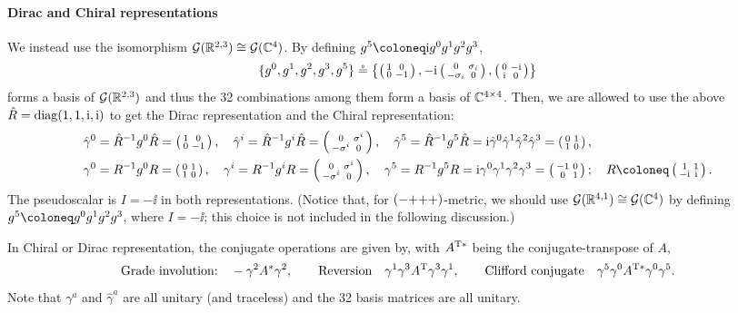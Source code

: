 \documentclass[CheatSheet]{subfiles}
\begin{document}
\paragraph{Dirac and Chiral representations}
We instead use the isomorphism $\operatorname{\mathcal{G}}({\mathbb{R}}^{2,3})\cong\operatorname{\mathcal{G}}({\mathbb{C}}^4)$. By defining $g^5\deq\ii g^0g^1g^2g^3$,
\[
\{g^0,g^1,g^2,g^3,g^5\}\circeq \left\{\left(\begin{smallmatrix}1&0\\0&-1\end{smallmatrix}\right),-{\mathrm{i}}\left(\begin{smallmatrix}0&\sigma_i\\-\sigma_i&0\end{smallmatrix}\right),\left(\begin{smallmatrix}0&-{\mathrm{i}}\\{\mathrm{i}}&0\end{smallmatrix}\right)\right\}
\]
forms a basis of $\operatorname{\mathcal{G}}({\mathbb{R}}^{2,3})$ and thus the 32 combinations among them form a basis of ${\mathbb{C}}^{4\times4}$.
Then, we are allowed to use the above $\hat R=\operatorname{\mathrm{diag}}(1,1,{\mathrm{i}},{\mathrm{i}})$ to get the Dirac representation and the Chiral representation:
\begin{align}
&\hat\gamma^0=\hat R^{-1}g^0 \hat R=\spmat{1&0\\0&-1},\quad
\hat\gamma^i=\hat R^{-1}g^i \hat R=\spmat{0&\sigma^i\\-\sigma^i&0},\quad
\hat\gamma^5=\hat R^{-1}g^5 \hat R=\ii\hat\gamma^0\hat\gamma^1\hat\gamma^2\hat\gamma^3=\spmat{0&1\\1&0},\\
&\gamma^0=R^{-1}g^0 R=\spmat{0&1\\1&0},\quad
\gamma^i=R^{-1}g^i R=\spmat{0&\sigma^i\\-\sigma^i&0},\quad
\gamma^5=R^{-1}g^5 R=\ii\gamma^0\gamma^1\gamma^2\gamma^3=\spmat{-1&0\\0&1};\quad
R\deq\spmat{1&1\\-\ii&\ii}.
\end{align}
The pseudoscalar is $I=-\ii$ in both representations.
(Notice that, for $(\mathord{-}\mathord{+}\mathord{+}\mathord{+})$-metric, we should use $\operatorname{\mathcal{G}}({\mathbb{R}}^{4,1})\cong\operatorname{\mathcal{G}}({\mathbb{C}}^4)$ by defining $g^5\deq g^0g^1g^2g^3$, where $I=-\ii$; this choice is not included in the following discussion.)

In Chiral or Dirac representation, the conjugate operations are given by, with $A^{{\mathrm{T}}*}$ being  the conjugate-transpose of $A$,
\begin{equation}
  \text{Grade involution:}\quad -\gamma^2 A^* \gamma^2,\qquad
  \text{Reversion}\quad \gamma^1\gamma^3 A^{\mathrm{T}} \gamma^3\gamma^1,\qquad
  \text{Clifford conjugate}\quad \gamma^5\gamma^0A^{{\mathrm{T}}*}\gamma^0\gamma^5.
\end{equation}
Note that $\gamma^a$ and $\hat\gamma^a$ are all unitary (and traceless) and the 32 basis matrices are all unitary.
\end{document}
